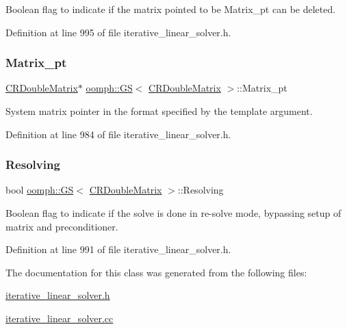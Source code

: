 Boolean flag to indicate if the matrix pointed to be Matrix\+\_\+pt can be deleted. 



Definition at line 995 of file iterative\+\_\+linear\+\_\+solver.\+h.

\mbox{\label{classoomph_1_1GS_3_01CRDoubleMatrix_01_4_aa802bd3307059805f5736859a6876993}} 
\subsubsection{\texorpdfstring{Matrix\+\_\+pt}{Matrix\_pt}}
{\footnotesize\ttfamily \hyperlink{classoomph_1_1CRDoubleMatrix}{C\+R\+Double\+Matrix}$\ast$ \hyperlink{classoomph_1_1GS}{oomph\+::\+GS}$<$ \hyperlink{classoomph_1_1CRDoubleMatrix}{C\+R\+Double\+Matrix} $>$\+::Matrix\+\_\+pt\hspace{0.3cm}{\ttfamily [private]}}



System matrix pointer in the format specified by the template argument. 



Definition at line 984 of file iterative\+\_\+linear\+\_\+solver.\+h.

\mbox{\label{classoomph_1_1GS_3_01CRDoubleMatrix_01_4_afbe2e9586e313c3a46156ee07ea9fe37}} 
\subsubsection{\texorpdfstring{Resolving}{Resolving}}
{\footnotesize\ttfamily bool \hyperlink{classoomph_1_1GS}{oomph\+::\+GS}$<$ \hyperlink{classoomph_1_1CRDoubleMatrix}{C\+R\+Double\+Matrix} $>$\+::Resolving\hspace{0.3cm}{\ttfamily [private]}}



Boolean flag to indicate if the solve is done in re-\/solve mode, bypassing setup of matrix and preconditioner. 



Definition at line 991 of file iterative\+\_\+linear\+\_\+solver.\+h.



The documentation for this class was generated from the following files\+:\begin{DoxyCompactItemize}
\item 
\hyperlink{iterative__linear__solver_8h}{iterative\+\_\+linear\+\_\+solver.\+h}\item 
\hyperlink{iterative__linear__solver_8cc}{iterative\+\_\+linear\+\_\+solver.\+cc}\end{DoxyCompactItemize}
